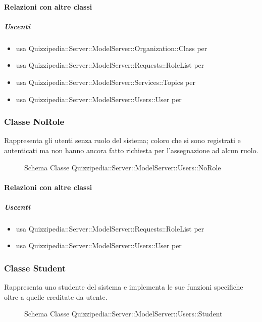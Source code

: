 \paragraph{Relazioni con altre classi}
\subparagraph{Uscenti}
\begin{itemize}
\item usa Quizzipedia::Server::ModelServer::Organization::Class per 
\item usa Quizzipedia::Server::ModelServer::Requests::RoleList per 
\item usa Quizzipedia::Server::ModelServer::Services::Topics per 
\item usa Quizzipedia::Server::ModelServer::Users::User per 
\end{itemize}
\subsubsection{Classe NoRole}
Rappresenta gli utenti senza ruolo del sistema; coloro che si sono registrati e autenticati ma non hanno ancora fatto richiesta per l'assegnazione ad alcun ruolo.
\begin{figure}[H]
\centering
\noindent{}
\caption[Schema Classe NoRole]{Schema Classe Quizzipedia::Server::ModelServer::Users::NoRole}
\end{figure}
\paragraph{Relazioni con altre classi}
\subparagraph{Uscenti}
\begin{itemize}
\item usa Quizzipedia::Server::ModelServer::Requests::RoleList per 
\item usa Quizzipedia::Server::ModelServer::Users::User per 
\end{itemize}
\subsubsection{Classe Student}
Rappresenta uno studente del sistema e implementa le sue funzioni specifiche oltre a quelle ereditate da utente.
\begin{figure}[H]
\centering
\noindent{}
\caption[Schema Classe Student]{Schema Classe Quizzipedia::Server::ModelServer::Users::Student}
\end{figure}
